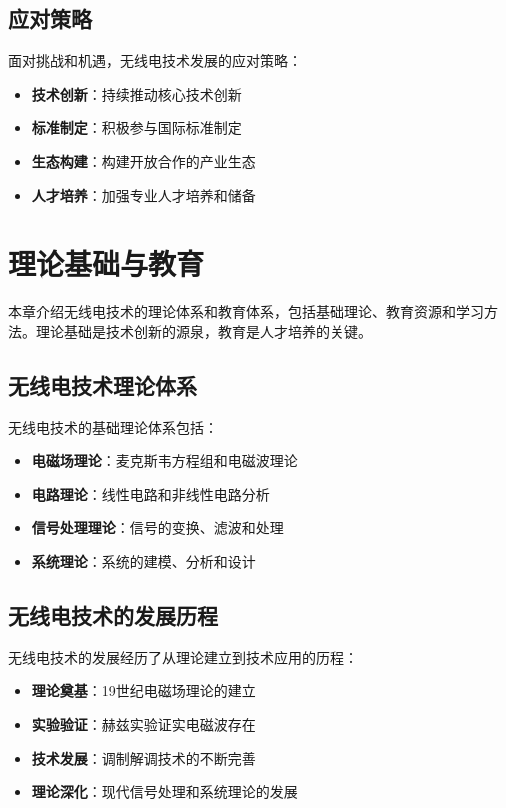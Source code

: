 \documentclass[12pt,UTF8]{ctexbook}
\begin{document}
\section{应对策略}

面对挑战和机遇，无线电技术发展的应对策略：

\begin{itemize}[leftmargin=3.5em]
    \item \textbf{技术创新}：持续推动核心技术创新
    \item \textbf{标准制定}：积极参与国际标准制定
    \item \textbf{生态构建}：构建开放合作的产业生态
    \item \textbf{人才培养}：加强专业人才培养和储备
\end{itemize}

\chapter{理论基础与教育}

本章介绍无线电技术的理论体系和教育体系，包括基础理论、教育资源和学习方法。理论基础是技术创新的源泉，教育是人才培养的关键。

\section{无线电技术理论体系}

无线电技术的基础理论体系包括：

\begin{itemize}[leftmargin=3.5em]
    \item \textbf{电磁场理论}：麦克斯韦方程组和电磁波理论
    \item \textbf{电路理论}：线性电路和非线性电路分析
    \item \textbf{信号处理理论}：信号的变换、滤波和处理
    \item \textbf{系统理论}：系统的建模、分析和设计
\end{itemize}

\section{无线电技术的发展历程}

无线电技术的发展经历了从理论建立到技术应用的历程：

\begin{itemize}[leftmargin=3.5em]
    \item \textbf{理论奠基}：19世纪电磁场理论的建立
    \item \textbf{实验验证}：赫兹实验证实电磁波存在
    \item \textbf{技术发展}：调制解调技术的不断完善
    \item \textbf{理论深化}：现代信号处理和系统理论的发展
\end{itemize}
\end{document}
